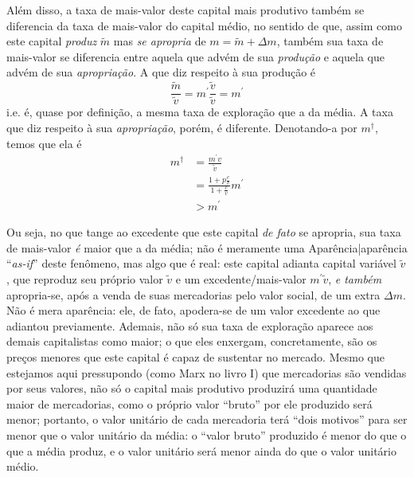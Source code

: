 Além disso, a taxa de mais-valor deste capital mais produtivo também se diferencia da taxa de mais-valor do capital médio, no sentido de que, assim como este capital \textit{produz} $\tilde{m}$ mas \textit{se apropria} de $m = \tilde{m} + \Delta m$, também sua taxa de mais-valor se diferencia entre aquela que advém de sua \textit{produção} e aquela que advém de sua \textit{apropriação}. A que diz respeito à sua produção é
$$
\frac{\tilde{m}}{\tilde{v}} = m^{\prime} \frac{\tilde{v}}{\tilde{v}} = m^{\prime}
$$
i.e. é, quase por definição, a mesma taxa de exploração que a da média. A taxa que diz respeito à sua \textit{apropriação}, porém, é diferente. Denotando-a por $m^{\dagger}$, temos que ela é
\begin{align*}
m^{\dagger} &= \frac{m^{\prime}v}{\tilde{v}}\\
&= \frac{1+p \frac{c}{v}}{1+\frac{c}{v}} m^{\prime} \\
&> m^{\prime}
\end{align*}

Ou seja, no que tange ao excedente que este capital \textit{de fato} se apropria, sua taxa de mais-valor \textit{é} maior que a da média; não é meramente uma Aparência|aparência ``\textit{as-if}'' deste fenômeno, mas algo que é real: este capital adianta capital variável $\tilde{v}$, que reproduz seu próprio valor $\tilde{v}$ e um excedente/mais-valor $m^{\prime}\tilde{v}$, \textit{e também} apropria-se, após a venda de suas mercadorias pelo valor social, de um extra $\Delta m$. Não é mera aparência: ele, de fato, apodera-se de um valor excedente ao que adiantou previamente. Ademais, não só sua taxa de exploração aparece aos demais capitalistas como maior; o que eles enxergam, concretamente, são os preços menores que este capital é capaz de sustentar no mercado. Mesmo que estejamos aqui pressupondo (como Marx no livro I) que mercadorias são vendidas por seus valores, não só o capital mais produtivo produzirá uma quantidade maior de mercadorias, como o próprio valor ``bruto'' por ele produzido será menor; portanto, o valor unitário de cada mercadoria terá ``dois motivos'' para ser menor que o valor unitário da média: o ``valor bruto'' produzido é menor do que o que a média produz, e o valor unitário será menor ainda do que o valor unitário médio.

